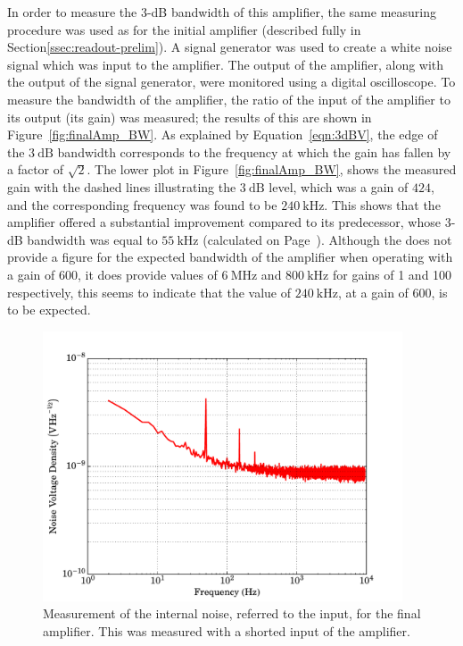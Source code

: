 In order to measure the 3-dB bandwidth of this amplifier, the same measuring procedure was used as for the initial amplifier (described fully in Section\ref{ssec:readout-prelim}). A signal generator was used to create a white noise signal which was input to the amplifier. The output of the amplifier, along with the output of the signal generator, were monitored using a digital oscilloscope. To measure the bandwidth of the amplifier, the ratio of the input of the amplifier to its output (its gain) was measured; the results of this are shown in Figure~\ref{fig:finalAmp_BW}. As explained by Equation~\ref{eqn:3dBV}, the edge of the $3~\mathrm{dB}$ bandwidth corresponds to the frequency at which the gain has fallen by a factor of $\sqrt{2}$. The lower plot in Figure~\ref{fig:finalAmp_BW}, shows the measured gain with the dashed lines illustrating the $3~\mathrm{dB}$ level, which was a gain of $424$, and the corresponding frequency was found to be $240~\mathrm{kHz}$\label{res:final_amp_BW}. This shows that the amplifier offered a substantial improvement compared to its predecessor, whose 3-dB bandwidth was equal to $55~\mathrm{kHz}$ (calculated on Page~\pageref{res:RTD_amp_BW}). Although the \textcite{INA103DS} does not provide a figure for the expected bandwidth of the amplifier when operating with a gain of 600, it does provide values of $6~\mathrm{MHz}$ and $800~\mathrm{kHz}$ for gains of 1 and 100 respectively, this seems to indicate that the value of $240~\mathrm{kHz}$, at a gain of 600, is to be expected.
\begin{figure}[t]
\begin{center}
\includegraphics[width = 0.95\textwidth]{figures/final_amp_IRN}
\caption[Measurement of the internal noise, referred to the input, for the final amplifier.]{Measurement of the internal noise, referred to the input, for the final amplifier. This was measured with a shorted input of the amplifier.}
\label{fig:finalAmp_IRN}
\end{center}
\end{figure}
